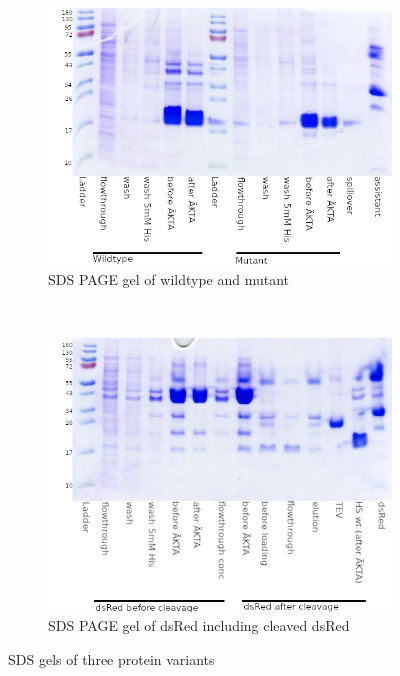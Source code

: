\begin{figure}
    \centering
    \begin{subfigure}{0.45\textwidth}
        \includegraphics[width=\textwidth]{img/sds_wt_mut}
        \caption{SDS PAGE gel of wildtype and mutant}
        \label{fig:sds_wt_mut}
    \end{subfigure}
    ~
    \begin{subfigure}{0.45\textwidth}
        \includegraphics[width=\textwidth]{img/sds_dsred_tev_cleavage.png}
        \caption{SDS PAGE gel of dsRed including cleaved dsRed}
        \label{fig:sds_wt_mut}
    \end{subfigure}
    \caption{SDS gels of three protein variants}
    \label{fig:sds}
\end{figure}

